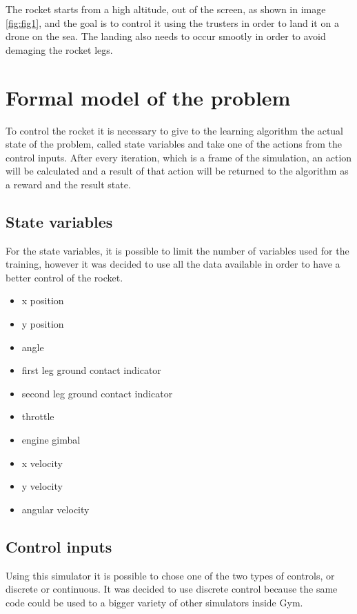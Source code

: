 \documentclass{article}
\begin{document}
The rocket starts from a high altitude, out of the screen, as shown in image \ref{fig:fig1}, and the goal is to control it using the trusters in order to land it on a drone on the sea. The landing also needs to occur smootly in order to avoid demaging the rocket legs.

\section{Formal model of the problem}
To control the rocket it is necessary to give to the learning algorithm the actual state of the problem, called state variables and take one of the actions from the control inputs.
After every iteration, which is a frame of the simulation, an action will be calculated and a result of that action will be returned to the algorithm as a reward and the result state.

\subsection{State variables}
For the state variables, it is possible to limit the number of variables used for the training, however it was decided to use all the data available in order to have a better control of the rocket.

\begin{itemize}
	\item x position
    \item y position
    \item angle
    \item first leg ground contact indicator
    \item second leg ground contact indicator
    \item throttle
    \item engine gimbal
	\item x velocity
    \item y velocity
    \item angular velocity
\end{itemize}

\subsection{Control inputs}
Using this simulator it is possible to chose one of the two types of controls, or discrete or continuous. It was decided to use discrete control because the same code could be used to a bigger variety of other simulators inside Gym.
\end{document}

